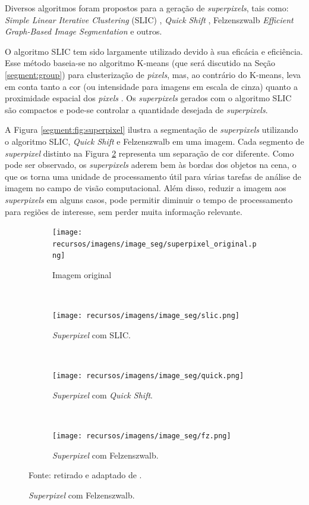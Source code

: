 Diversos algoritmos foram propostos para a geração de \textit{superpixels}, tais como: \textit{Simple Linear Iterative Clustering} (SLIC) \citep{Achanta2012SLICMethods}, \textit{Quick Shift} \citep{Vedaldi2008QuickSeeking}, Felzenszwalb \textit{Efficient Graph-Based Image Segmentation} \citep{Felzenszwalb2004EfficientSegmentation} e outros.

O algoritmo SLIC tem sido largamente utilizado devido à sua eficácia e eficiência. Esse método baseia-se no algoritmo K-means (que será discutido na Seção \ref{segment:group}) para clusterização de \textit{pixels}, mas, ao contrário do K-means, leva em conta tanto a cor (ou intensidade para imagens em escala de cinza) quanto a proximidade espacial dos \textit{pixels} \citep{Achanta2012SLICMethods}. Os \textit{superpixels} gerados com o algoritmo SLIC são compactos e pode-se controlar a quantidade desejada de \textit{superpixels}.

A Figura \ref{segment:fig:superpixel} ilustra a segmentação de \textit{superpixels} utilizando o algoritmo SLIC, \textit{Quick Shift} e Felzenszwalb em uma imagem. Cada segmento de \textit{superpixel} distinto na Figura \ref{segment:fig:superpixel.2} representa um separação de cor diferente. Como pode ser observado, os \textit{superpixels} aderem bem às bordas dos objetos na cena, o que os torna uma unidade de processamento útil para várias tarefas de análise de imagem no campo de visão computacional. Além disso, reduzir a imagem aos \textit{superpixels} em alguns casos, pode permitir diminuir o tempo de processamento para regiões de interesse, sem perder muita informação relevante.

\begin{figure}[H]
   \caption{Exemplo da segmentação com \textit{superpixels}.}
   \centering
   \label{segment:fig:superpixel}
    \begin{subfigure}[t]{0.45\textwidth}
        \centering
        \texttt{[image: recursos/imagens/image\_seg/superpixel\_original.png]}
        \caption{Imagem original}
        \label{segment:fig:superpixel.1}
    \end{subfigure}%
    ~ 
    \begin{subfigure}[t]{0.45\textwidth}
        \centering
        \texttt{[image: recursos/imagens/image\_seg/slic.png]}
        \caption{\textit{Superpixel} com SLIC.}
        \label{segment:fig:superpixel.2}
    \end{subfigure}%
    ~ 
    
    \begin{subfigure}[t]{0.45\textwidth}
        \centering
        \texttt{[image: recursos/imagens/image\_seg/quick.png]}
        \caption{\textit{Superpixel} com \textit{Quick Shift}.}
        \label{segment:fig:superpixel.3}
    \end{subfigure}
    ~
    \begin{subfigure}[t]{0.45\textwidth}
        \centering
        \texttt{[image: recursos/imagens/image\_seg/fz.png]}
        \caption{\textit{Superpixel} com Felzenszwalb.}
        \label{segment:fig:superpixel.4}
    \end{subfigure}
    
    Fonte: retirado e adaptado de \cite{Neuhold2017_ICCV}.
\end{figure}

